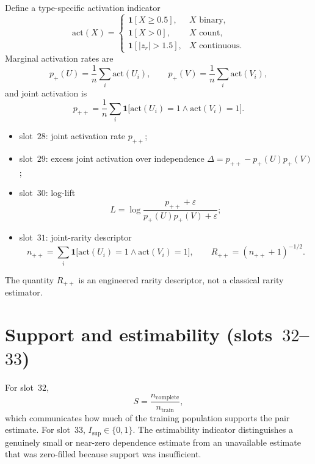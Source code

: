 Define a type-specific activation indicator
\begin{equation}
\label{eq:app-act}
\mathrm{act}(X)
=
\begin{cases}
\mathbf{1}[X\ge 0.5], & X\text{ binary},\\
\mathbf{1}[X>0], & X\text{ count},\\
\mathbf{1}[\lvert z_{r}\rvert>1.5], & X\text{ continuous}.
\end{cases}
\end{equation}
Marginal activation rates are
\begin{equation}
p_{+}(U)=\frac{1}{n}\sum_{i}\mathrm{act}(U_{i}),
\qquad
p_{+}(V)=\frac{1}{n}\sum_{i}\mathrm{act}(V_{i}),
\end{equation}
and joint activation is
\begin{equation}
p_{++}
=
\frac{1}{n}
\sum_{i}
\mathbf{1}\bigl[\mathrm{act}(U_{i})=1\wedge\mathrm{act}(V_{i})=1\bigr].
\end{equation}
\begin{itemize}
\item slot~$28$: joint activation rate $p_{++}$;
\item slot~$29$: excess joint activation over independence $\Delta=p_{++}-p_{+}(U)p_{+}(V)$;
\item slot~$30$: log-lift
\begin{equation}
L=\log\frac{p_{++}+\varepsilon}{p_{+}(U)p_{+}(V)+\varepsilon};
\end{equation}
\item slot~$31$: joint-rarity descriptor
\begin{equation}
n_{++}=\sum_{i}\mathbf{1}\bigl[\mathrm{act}(U_{i})=1\wedge\mathrm{act}(V_{i})=1\bigr],
\qquad
R_{++}=(n_{++}+1)^{-1/2}.
\end{equation}
\end{itemize}
The quantity $R_{++}$ is an engineered rarity descriptor, not a classical rarity estimator.

\section{Support and estimability (slots~$32$--$33$)}
\label{app:hcr-support}

For slot~$32$,
\begin{equation}
S=\frac{n_{\mathrm{complete}}}{n_{\mathrm{train}}},
\end{equation}
which communicates how much of the training population supports the pair estimate.
For slot~$33$, $I_{\mathrm{sup}}\in\{0,1\}$.
The estimability indicator distinguishes a genuinely small or near-zero dependence estimate from an unavailable estimate that was zero-filled because support was insufficient.


